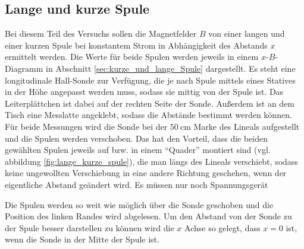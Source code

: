\subsection{Lange und kurze Spule}
Bei diesem Teil des Versuchs sollen die Magnetfelder $B$ von einer langen und einer kurzen Spule bei konstantem Strom in Abhängigkeit 
des Abstands $x$ ermittelt werden.
Die Werte für beide Spulen werden jeweils in einem $x$-$B$-Diagramm in Abschnitt \ref{sec:kurze_und_lange_Spule} dargestellt.
Es steht eine longitudinale Hall-Sonde zur Verfügung, die je nach Spule mittels eines Statives in der Höhe angepasst werden muss, 
sodass sie mittig von der Spule ist.
Das Leiterplättchen ist dabei auf der rechten Seite der Sonde.
Außerdem ist an dem Tisch eine Messlatte angeklebt, sodass die Abstände bestimmt werden können.
Für beide Messungen wird die Sonde bei der $\qty{50}{\cm}$ Marke des Lineals aufgestellt und die Spulen werden verschoben.
Das hat den Vorteil, dass die beiden gewählten Spulen jeweils auf bzw. in einem \enquote{Quader} montiert sind (vgl. abbildung \ref{fig:lange_kurze_spule}), 
die man längs des Lineals verschiebt,  sodass keine ungewollten Verschiebung in eine andere Richtung geschehen, wenn der eigentliche Abstand geändert wird.
Es müssen nur noch Spannungsgerät 

\noindent
Die Spulen werden so weit wie möglich über die Sonde geschoben und die Position des linken Randes wird abgelesen.
Um den Abstand von der Sonde zu der Spule besser darstellen zu können wird die $x$ Achse so gelegt, 
dass $x = 0$ ist, wenn die Sonde in der Mitte der Spule ist.


